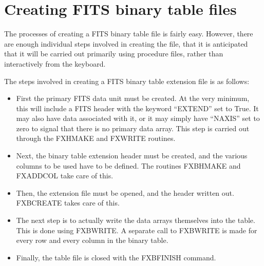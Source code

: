 
\setlength{\oddsidemargin}{0in}		%
\setlength{\topmargin}{-0.5in}		%
\setlength{\textwidth}{6.5in}		%
\setlength{\textheight}{9in}		%

\addtolength{\parskip}{0.5\baselineskip}

\thispagestyle{empty}			%



\section{Creating FITS binary table files}

The processes of creating a FITS binary table file is fairly easy.  However,
there are enough individual steps involved in creating the file, that it is
anticipated that it will be carried out primarily using procedure files, rather
than interactively from the keyboard.

The steps involved in creating a FITS binary table extension file is as
follows:
%
\begin{itemize}
\item
	First the primary FITS data unit must be created.  At the very minimum,
	this will include a FITS header with the keyword ``EXTEND'' set to
	True.  It may also have data associated with it, or it may simply have
	``NAXIS'' set to zero to signal that there is no primary data array.
	This step is carried out through the FXHMAKE and FXWRITE routines.
\item
	Next, the binary table extension header must be created, and the
	various columns to be used have to be defined.  The routines FXBHMAKE
	and FXADDCOL take care of this.
\item
	Then, the extension file must be opened, and the header written out.
	FXBCREATE takes care of this.
\item
	The next step is to actually write the data arrays themselves into the
	table.  This is done using FXBWRITE.  A separate call to FXBWRITE is
	made for every row and every column in the binary table.
\item
	Finally, the table file is closed with the FXBFINISH command.
\end{itemize}

